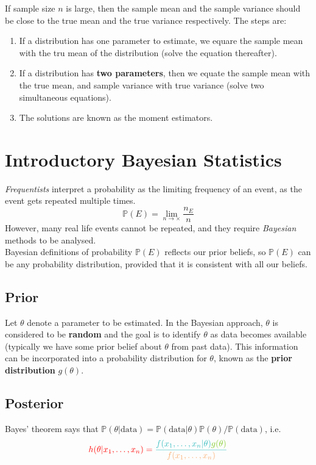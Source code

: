 \documentclass{article}
\begin{document}
If sample size $n$ is large, then the sample mean and the sample variance should be close to the true mean and the true variance respectively. The steps are: \begin{enumerate}
    \item If a distribution has one parameter to estimate, we equare the sample mean with the tru mean of the distribution (solve the equation thereafter). 
    \item If a distribution has \textbf{two parameters}, then we equate the sample mean with the true mean, and sample variance with true variance (solve two simultaneous equations). 
    \item The solutions are known as the moment estimators.
\end{enumerate}

\section{Introductory Bayesian Statistics}

\textit{Frequentists} interpret a probability as the limiting frequency of an event, as the event gets repeated multiple times. \begin{equation*}
    \mathbb{P}(E) = \lim_{n \to \times} \frac{n_E}{n}
\end{equation*} However, many real life events cannot be repeated, and they require \textit{Bayesian} methods to be analysed. \\

\noindent Bayesian definitions of probability $ \mathbb{P}(E)$ reflects our prior beliefs, so $ \mathbb{P}(E)$ can be any probability distribution, provided that it is consistent with all our beliefs. 

\subsection{Prior}
Let $\theta$ denote a parameter to be estimated. In the Bayesian approach, $\theta$ is considered to be \textbf{random} and the goal is to identify $\theta$ as data becomes available (typically we have some prior belief about $\theta$ from past data). This information can be incorporated into a probability distribution for $\theta$, known as the \textbf{prior distribution} $g(\theta)$. 

\subsection{Posterior}
Bayes' theorem says that $ \mathbb{P}(\theta | \text{data})= \mathbb{P}(\text{data} | \theta) \mathbb{P}(\theta) / \mathbb{P}(\text{data})$, i.e. \begin{equation}\label{eq: 14-posterior}
    \color{red} h(\theta | x_{1}, \dots , x_n) = \color{Aquamarine} \frac{f(x_{1}, \dots, x_n | \theta)\color{LimeGreen}g(\theta)}{\color{Apricot} f(x_{1}, \dots, x_n)}
\end{equation}
\end{document}
